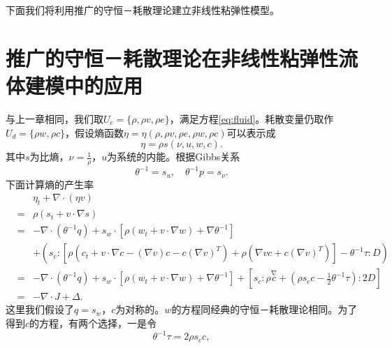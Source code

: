 

下面我们将利用推广的守恒－耗散理论建立非线性粘弹性模型。

\section{推广的守恒－耗散理论在非线性粘弹性流体建模中的应用}
与上一章相同，我们取$U_c = \{ \rho,\rho v,\rho e\}$，满足方程\eqref{eq:fluid}。耗散变量仍取作$U_d =\{\rho w, \rho c\}$，假设熵函数$\eta =\eta(\rho,\rho v,\rho e,\rho w,\rho c)$可以表示成
\begin{equation*}
	\eta = \rho s(\nu,u,w,c).
\end{equation*}
其中$s$为比熵，$\nu = \frac{1}{\rho}$，$u$为系统的内能。根据Gibbs关系
\begin{equation*}
		\theta^{-1} = s_u, \quad \theta^{-1} p = s_{\nu}.
\end{equation*}
下面计算熵的产生率
\begin{eqnarray*}
		&&\eta_t + \nabla \cdot (\eta v) \\
		&=& \rho (s_t + v \cdot \nabla s) \\
		&=& -\nabla \cdot (\theta^{-1} q) + s_w \cdot [\rho (w_t + v \cdot \nabla w) + \nabla \theta^{-1}] \\
		&&+ (s_c:[\rho (c_t + v \cdot \nabla c - (\nabla v) c - c (\nabla v)^T) + \rho (\nabla v c + c (\nabla v)^T)] - \theta^{-1} \tau : D) \\
		&=& -\nabla \cdot (\theta^{-1} q) + s_w \cdot [\rho (w_t + v \cdot \nabla w) + \nabla \theta^{-1}] + [ s_c:\rho \stackrel{\nabla}{c} + (\rho s_c c - \frac{1}{2} \theta^{-1} \tau): 2 D]   \\
		&=& -\nabla \cdot J + \Delta.
	\end{eqnarray*}	
	这里我们假设了$q=s_w$，$c$为对称的。$w$的方程同经典的守恒－耗散理论相同。为了得到$c$的方程，有两个选择，一是令
	\begin{equation*}
		\theta^{-1} \tau = 2 \rho s_c c,
	\end{equation*}
